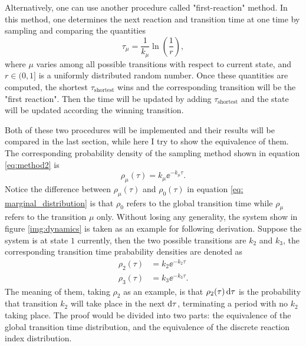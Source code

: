 		Alternatively, one can use another procedure called "first-reaction" method. In this method, one determines the next reaction and transition time at one time by sampling and comparing the quantities
		\begin{equation}
			\tau_\mu = \frac{1}{k_\mu}\ln{\left(\frac{1}{r}\right)},
			\label{eq:method2}
		\end{equation}
		where $\mu$ varies among all possible transitions with respect to current state, and $r \in (0,1]$ is a uniformly distributed random number. Once these quantities are computed, the shortest $\tau_{\text{shortest}}$ wins and the corresponding transition will be the "first reaction". Then the time will be updated by adding $\tau_{\text{shortest}}$ and the state will be updated according the winning transition.

		Both of these two procedures will be implemented and their results will be compared in the last section, while here I try to show the equivalence of them. The corresponding probability density of the sampling method shown in equation \eqref{eq:method2} is
		\begin{equation}
			\rho_\mu(\tau) = k_\mu \ee^{-k_\mu\tau}.
			\label{eq:partial_tau_prob}
		\end{equation}
		Notice the difference between $\rho_\mu(\tau)$ and $\rho_0(\tau)$ in equation \eqref{eq: marginal_distribution} is that $\rho_0$ refers to the global transition time while $\rho_\mu$ refers to the transition $\mu$ only. Without losing any generality, the system show in figure \ref{img:dynamics} is taken as an example for following derivation. Suppose the system is at state $1$ currently, then the two possible transitions are $k_2$ and $k_3$, the corresponding transition time prabability densities are denoted as
		\begin{equation}
			\begin{aligned}
			\rho_2(\tau) &= k_2 \ee^{-k_2\tau} \\
			\rho_3(\tau) &= k_3 \ee^{-k_3\tau}.
			\end{aligned}
		\end{equation}
		The meaning of them, taking $\rho_2$ as an example, is that $\rho_2(\tau)\operatorname{d\!} \tau$ is the probability that transition $k_2$ will take place in the next $\operatorname{d\!} \tau$, terminating a period with no $k_2$ taking place. The proof would be divided into two parts: the equivalence of the global transition time distribution, and the equivalence of the discrete reaction index distribution.


